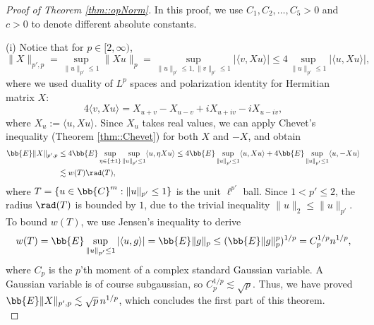 \documentclass[12pt]{article}%
\theoremstyle{plain}%
\theoremstyle{remark}
\begin{document}
\begin{proof}[Proof of Theorem \ref{thm::opNorm}]
In this proof, we use $C_1, C_2,\ldots,C_5 > 0$ and $c>0$ to denote different absolute constants.

(i) Notice that for $p \in [2,\infty)$,
\begin{equation*}
\| X \|_{p',p} = \sup_{\| u \|_{p'} \le 1} \| X u \|_{p} = \sup_{\|u\|_{p'} \le 1, \|v\|_{p'} \le 1} | \langle v, Xu \rangle | \le  4\sup_{ \| u \|_{p'} \le 1} | \langle u, Xu \rangle |,
\end{equation*}
where we used duality of $L^p$ spaces and polarization identity for Hermitian matrix $X$:
\begin{equation*}
4\langle v, Xu \rangle = X_{u+v} - X_{u-v} +i X_{u +iv} - iX_{u-iv},
\end{equation*}
where $X_u := \langle u, Xu \rangle$. Since $X_u$ takes real values, we can apply Chevet's inequality (Theorem \ref{thm::Chevet}) for both $X$ and $-X$, and obtain 
\begin{align*}
\bb{E} \| X \|_{p',p}  &\le 4 \bb{E} \sup_{\eta \in \{ \pm 1\}} \sup_{ \| u \|_{p'} \le 1} \langle u, \eta Xu \rangle \le 4\bb{E}  \sup_{ \| u \|_{p'} \le 1} \langle u,  Xu \rangle  + 4\bb{E}  \sup_{ \| u \|_{p'} \le 1} \langle u, -Xu \rangle  \\
& \lesssim w(T) \rad(T),
\end{align*} 
where $T= \{ u \in \bb{C}^m:  \| u \|_{p'} \le 1 \}$ is the unit $\ell^{p'}$ ball. Since $1 < p' \le 2$, the radius $\rad(T)$ is bounded by $1$, due to the trivial inequality $\| u \|_{2} \le \| u \|_{p'}$. To bound $w(T)$, we use Jensen's inequality to derive
\begin{equation*}
w(T) = \bb{E} \sup_{\| u \|_{p'} \le 1} | \langle u, g \rangle | = \bb{E} \| g \|_{p} \le ( \bb{E} \| g \|_p^p )^{1/p} = C_p^{1/p} n^{1/p},
\end{equation*}
where $C_p$ is the $p$'th moment of a complex standard Gaussian variable. A Gaussian variable is of course subgaussian, so $C_p^{1/p} \lesssim \sqrt{p}$. Thus, we have proved $\bb{E} \| X \|_{p',p} \lesssim \sqrt{p}\, n^{1/p}$, which concludes the first part of this theorem.\\


\end{proof}
\end{document}
